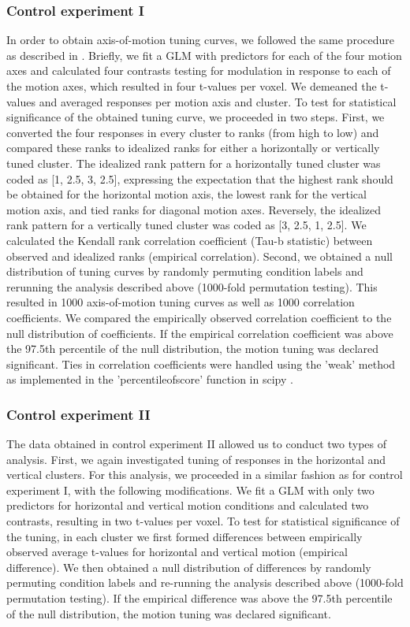\subsubsection{Control experiment I}
In order to obtain axis-of-motion tuning curves, we followed the same procedure as described in \cite{EmmerlingPhDThesis}. Briefly, we fit a GLM with predictors for each of the four motion axes and calculated four contrasts testing for modulation in response to each of the motion axes, which resulted in four t-values per voxel. We demeaned the t-values and averaged responses per motion axis and cluster. To test for statistical significance of the obtained tuning curve, we proceeded in two steps. First, we converted the four responses in every cluster to ranks (from high to low) and compared these ranks to idealized ranks for either a horizontally or vertically tuned cluster. The idealized rank pattern for a horizontally tuned cluster was coded as [1, 2.5, 3, 2.5], expressing the expectation that the highest rank should be obtained for the horizontal motion axis, the lowest rank for the vertical motion axis, and tied ranks for diagonal motion axes. Reversely, the idealized rank pattern for a vertically tuned cluster was coded as [3, 2.5, 1, 2.5]. We calculated the Kendall rank correlation coefficient (Tau-b statistic) between observed and idealized ranks (empirical correlation). Second, we obtained a null distribution of tuning curves by randomly permuting condition labels and rerunning the analysis described above (1000-fold permutation testing). This resulted in 1000 axis-of-motion tuning curves as well as 1000 correlation coefficients. We compared the empirically observed correlation coefficient to the null distribution of coefficients. If the empirical correlation coefficient was above the 97.5th percentile of the null distribution, the motion tuning was declared significant. Ties in correlation coefficients were handled using the 'weak' method as implemented in the 'percentileofscore' function in scipy \parencite{scipy2001}.

\subsubsection{Control experiment II}
The data obtained in control experiment II allowed us to conduct two types of analysis. First, we again investigated tuning of responses in the horizontal and vertical clusters. For this analysis, we proceeded in a similar fashion as for control experiment I, with the following modifications. We fit a GLM with only two predictors for horizontal and vertical motion conditions and calculated two contrasts, resulting in two t-values per voxel. To test for statistical significance of the tuning, in each cluster we first formed differences between empirically observed average t-values for horizontal and vertical motion (empirical difference). We then obtained a null distribution of differences by randomly permuting condition labels and re-running the analysis described above (1000-fold permutation testing). If the empirical difference was above the 97.5th percentile of the null distribution, the motion tuning was declared significant.

